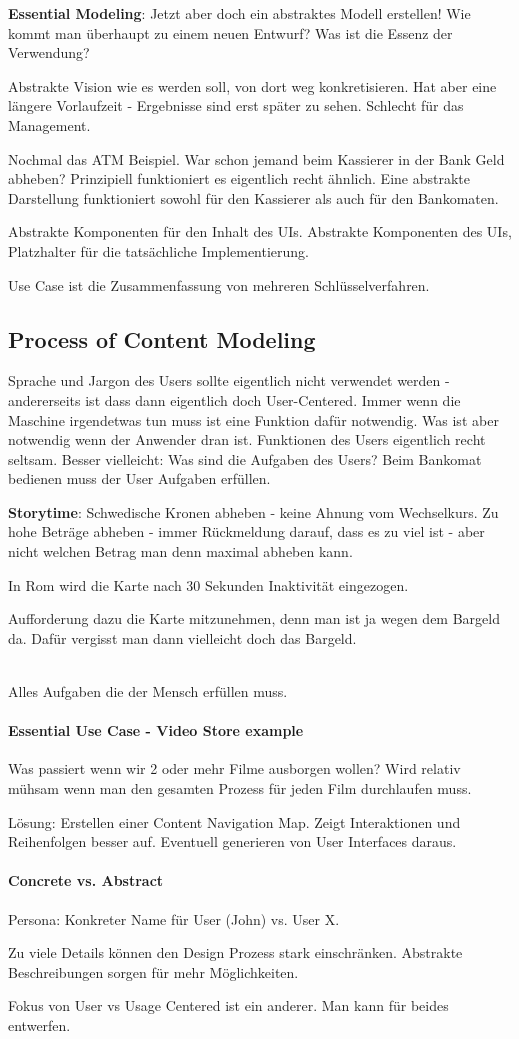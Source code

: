 \textbf{Essential Modeling}: Jetzt aber doch ein abstraktes Modell erstellen! 
Wie kommt man überhaupt zu einem neuen Entwurf? Was ist die Essenz der Verwendung?

Abstrakte Vision wie es werden soll, von dort weg konkretisieren. Hat aber eine
längere Vorlaufzeit - Ergebnisse sind erst später zu sehen. Schlecht für das
Management.


Nochmal das ATM Beispiel. War schon jemand beim Kassierer in der Bank Geld abheben? 
Prinzipiell funktioniert es eigentlich recht ähnlich. 
Eine abstrakte Darstellung funktioniert sowohl für den Kassierer als auch für den Bankomaten. 

Abstrakte Komponenten für den Inhalt des UIs. Abstrakte Komponenten des UIs,
Platzhalter für die tatsächliche Implementierung. 

Use Case ist die Zusammenfassung von mehreren Schlüsselverfahren.

\subsection{Process of Content Modeling}
Sprache und Jargon des Users sollte eigentlich nicht verwendet werden - andererseits ist dass dann eigentlich doch User-Centered.
Immer wenn die Maschine irgendetwas tun muss ist eine Funktion dafür notwendig.
Was ist aber notwendig wenn der Anwender dran ist. Funktionen des Users eigentlich
recht seltsam. Besser vielleicht: Was sind die Aufgaben des Users?
Beim Bankomat bedienen muss der User Aufgaben erfüllen.
\parbox{\textwidth}{%
\textbf{Storytime}: Schwedische Kronen abheben - keine Ahnung vom Wechselkurs.
Zu hohe Beträge abheben - immer Rückmeldung darauf, dass es zu viel ist - aber nicht
welchen Betrag man denn maximal abheben kann.

In Rom wird die Karte nach 30 Sekunden Inaktivität eingezogen.

Aufforderung dazu die Karte mitzunehmen, denn man ist ja wegen dem Bargeld da.
Dafür vergisst man dann vielleicht doch das Bargeld. 
}%
\\
Alles Aufgaben die der Mensch erfüllen muss. 

\paragraph{Essential Use Case - Video Store example}
Was passiert wenn wir 2 oder mehr Filme ausborgen wollen? Wird relativ mühsam
wenn man den gesamten Prozess für jeden Film durchlaufen muss. 

Lösung: Erstellen einer Content Navigation Map. Zeigt Interaktionen und Reihenfolgen
besser auf. Eventuell generieren von User Interfaces daraus.


\paragraph{Concrete vs. Abstract}
Persona: Konkreter Name für User (John) vs. User X. 

Zu viele Details können den Design Prozess stark einschränken. 
Abstrakte Beschreibungen sorgen für mehr Möglichkeiten.

Fokus von User vs Usage Centered ist ein anderer. Man kann für beides entwerfen.
